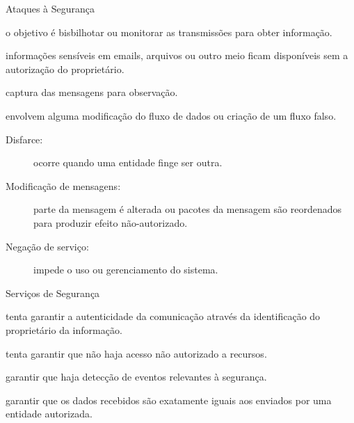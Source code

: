 \begin{frame}{Ataques à Segurança}\small
  \begin{description}[<+->]
  \item[Ataques passivos:] o objetivo é bisbilhotar ou monitorar as transmissões 
    para obter informação.
    \begin{description}[<+->]
    \item[Vazamento de conteúdo:] informações sensíveis em emails, arquivos 
      ou outro meio ficam disponíveis sem a autorização do proprietário.
    \item[Análise de tráfego:] captura das mensagens para observação.
    \end{description}
  \item[Ataques ativos:] envolvem alguma modificação do fluxo de dados 
    ou criação de um fluxo falso.
    \begin{description}
    \item[Disfarce:] ocorre quando uma entidade finge ser outra.
    \item[Modificação de mensagens:] parte da mensagem é alterada ou pacotes 
      da mensagem são reordenados para produzir efeito não-autorizado.
    \item[Negação de serviço:] impede o uso ou gerenciamento do sistema.
    \end{description}
  \end{description}
\end{frame}


\begin{frame}{Serviços de Segurança}

  \begin{description}[<+->]
  \item[Autenticação:] tenta garantir a autenticidade da comunicação 
    através da identificação do proprietário da informação.
  \item[Autorização:] tenta garantir que não haja acesso não 
    autorizado a recursos. 
  \item[Auditoria:] garantir que haja detecção de eventos relevantes 
    à segurança.
  \item[Verificação de integridade:] garantir que os dados recebidos 
    são exatamente iguais aos enviados por uma entidade autorizada.
  \end{description}
  
\end{frame}

